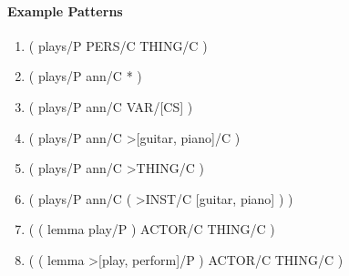 \documentclass[11pt]{scrreprt}
\begin{document}
\paragraph{Example Patterns}
\begin{enumerate}[label={$p_{\arabic*}$ = }]
	\item \textsf{( plays/P PERS/C THING/C )}
	\item \textsf{( plays/P ann/C * )} 
	\item \textsf{( plays/P ann/C VAR/[CS] )}
	\item \textsf{( plays/P ann/C >[guitar, piano]/C )}
	\item \textsf{( plays/P ann/C >THING/C )}
	\item \textsf{( plays/P ann/C ( >INST/C [guitar, piano] ) )}
	\item \textsf{( ( lemma play/P ) ACTOR/C THING/C )}
	\item \textsf{( ( lemma >[play, perform]/P ) ACTOR/C THING/C )}
\end{enumerate}

\end{document}
